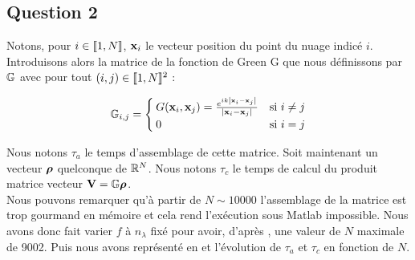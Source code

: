 \documentclass[10pt]{article}
\begin{document}
\begin{multicols}{2}
\vspace*{22pt}



\section*{Question 2}

Notons, pour $i \in  \llbracket 1,N \rrbracket $, ${\bf x}_i$ le vecteur position du point du nuage indicé $i$. Introduisons alors la matrice de la fonction de Green G que nous définissons par $\mathbb{G}$ avec pour tout $(i,j) \in  \llbracket 1,N \rrbracket ^{2}$ :

\begin{equation}
 \mathbb{G}_{i,j} =
 \begin{cases}
   G({\bf x}_i,{\bf x}_j) = \frac{e^{ik\left| {\bf x}_i - {\bf x}_j \right|}}{\left| {\bf x}_i - {\bf x}_j \right|} & \text{si } 
   i\neq j \\
   0 & \text{si } i=j
 \end{cases}
 \label{eq:green}
\end{equation}


Nous notons $\tau_{a}$ le temps d'assemblage de cette matrice. Soit maintenant un vecteur ${\boldsymbol{\rho}}$ quelconque de $\mathbb{R}^{N}$. Nous notons $\tau_c$ le temps de calcul du produit matrice vecteur ${\bf V} = \mathbb{G}{\boldsymbol{\rho}}$.\\

Nous pouvons remarquer qu'à partir de $N \sim 10 000$ l’assemblage de la matrice est trop gourmand en mémoire et cela rend l’exécution sous Matlab impossible. Nous avons donc fait varier $f$ à $n_\lambda$ fixé pour avoir, d'après , une valeur de $N$ maximale de 9002. Puis nous avons représenté en  et  l'évolution de $\tau_a$ et $\tau_c$ en fonction de $N$.

\vspace*{-11pt}


\end{multicols}
\end{document}
